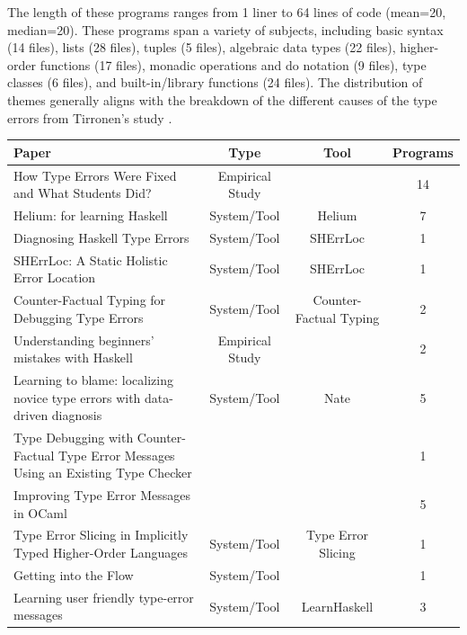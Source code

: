 \documentclass[pdflatex,sn-mathphys-num]{sn-jnl}%
\begin{document}
    The length of these programs ranges from 1 liner to 64 lines of code (mean=20, median=20). These programs span a variety of subjects, including basic syntax (14 files), lists (28 files), tuples (5 files), algebraic data types (22 files), higher-order functions (17 files), monadic operations and do notation (9 files), type classes (6 files), and built-in/library functions (24 files). The distribution of themes generally aligns with the breakdown of the different causes of the type errors from Tirronen's study \cite{Tirronen2015-nr}.  
    
    \begin{table}
    \centering
    \begin{tabular}{|p{5cm}|c|c|c|} \hline 
         \textbf{Paper} & \textbf{Type} & \textbf{Tool} & \textbf{Programs} \\ \hline 
         \raggedright How Type Errors Were Fixed and What Students Did? & Empirical Study &  &  14 \\ \hline 
         \raggedright Helium: for learning Haskell & System/Tool & Helium & 7 \\ \hline 
         \raggedright Diagnosing Haskell Type Errors & System/Tool & SHErrLoc & 1 \\ \hline 
         \raggedright SHErrLoc: A Static Holistic Error Location & System/Tool & SHErrLoc & 1 \\ \hline 
         \raggedright Counter-Factual Typing for Debugging Type Errors & System/Tool & Counter-Factual Typing & 2 \\ \hline 
         \raggedright Understanding beginners' mistakes with Haskell & Empirical Study &  & 2 \\ \hline
         \raggedright Learning to blame: localizing novice type errors with data-driven diagnosis & System/Tool & Nate & 5 \\ \hline
         \raggedright Type Debugging with Counter-Factual Type Error Messages Using an Existing Type Checker &  &  & 1 \\ \hline
         \raggedright Improving Type Error Messages in OCaml &  &  & 5 \\ \hline
         \raggedright Type Error Slicing in Implicitly Typed Higher-Order Languages & System/Tool & Type Error Slicing & 1 \\ \hline
         \raggedright Getting into the Flow & System/Tool &  & 1 \\ \hline
         \raggedright Learning user friendly type-error messages & System/Tool & LearnHaskell & 3 \\ \hline

\end{tabular}
\end{table}
\end{document}
